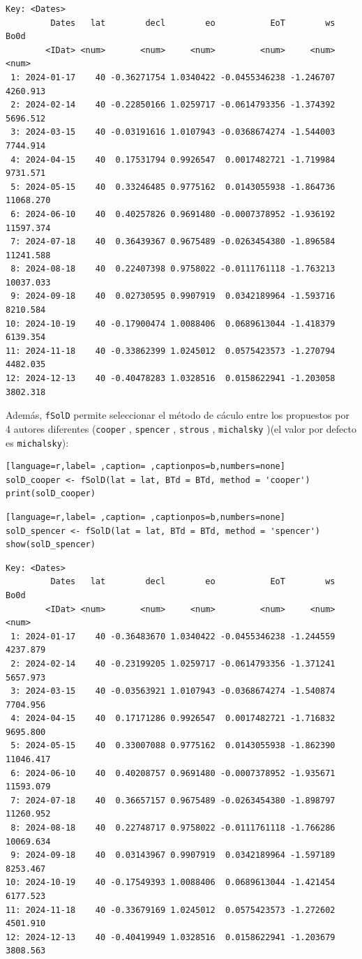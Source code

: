 \begin{verbatim}
Key: <Dates>
         Dates   lat        decl        eo           EoT        ws      Bo0d
        <IDat> <num>       <num>     <num>         <num>     <num>     <num>
 1: 2024-01-17    40 -0.36271754 1.0340422 -0.0455346238 -1.246707  4260.913
 2: 2024-02-14    40 -0.22850166 1.0259717 -0.0614793356 -1.374392  5696.512
 3: 2024-03-15    40 -0.03191616 1.0107943 -0.0368674274 -1.544003  7744.914
 4: 2024-04-15    40  0.17531794 0.9926547  0.0017482721 -1.719984  9731.571
 5: 2024-05-15    40  0.33246485 0.9775162  0.0143055938 -1.864736 11068.270
 6: 2024-06-10    40  0.40257826 0.9691480 -0.0007378952 -1.936192 11597.374
 7: 2024-07-18    40  0.36439367 0.9675489 -0.0263454380 -1.896584 11241.588
 8: 2024-08-18    40  0.22407398 0.9758022 -0.0111761118 -1.763213 10037.033
 9: 2024-09-18    40  0.02730595 0.9907919  0.0342189964 -1.593716  8210.584
10: 2024-10-19    40 -0.17900474 1.0088406  0.0689613044 -1.418379  6139.354
11: 2024-11-18    40 -0.33862399 1.0245012  0.0575423573 -1.270794  4482.035
12: 2024-12-13    40 -0.40478283 1.0328516  0.0158622941 -1.203058  3802.318
\end{verbatim}

Además, \texttt{fSolD} permite seleccionar el método de cáculo entre los propuestos por 4 autores diferentes (\texttt{cooper} \cite{Cooper1969}, \texttt{spencer} \cite{Spencer1971}, \texttt{strous} \cite{Strous2011}, \texttt{michalsky} \cite{Michalsky1988})(el valor por defecto es \texttt{michalsky}):
\begin{lstlisting}[language=r,label= ,caption= ,captionpos=b,numbers=none]
solD_cooper <- fSolD(lat = lat, BTd = BTd, method = 'cooper')
print(solD_cooper)
\end{lstlisting}

\begin{lstlisting}[language=r,label= ,caption= ,captionpos=b,numbers=none]
solD_spencer <- fSolD(lat = lat, BTd = BTd, method = 'spencer')
show(solD_spencer)
\end{lstlisting}

\begin{verbatim}
Key: <Dates>
         Dates   lat        decl        eo           EoT        ws      Bo0d
        <IDat> <num>       <num>     <num>         <num>     <num>     <num>
 1: 2024-01-17    40 -0.36483670 1.0340422 -0.0455346238 -1.244559  4237.879
 2: 2024-02-14    40 -0.23199205 1.0259717 -0.0614793356 -1.371241  5657.973
 3: 2024-03-15    40 -0.03563921 1.0107943 -0.0368674274 -1.540874  7704.956
 4: 2024-04-15    40  0.17171286 0.9926547  0.0017482721 -1.716832  9695.800
 5: 2024-05-15    40  0.33007088 0.9775162  0.0143055938 -1.862390 11046.417
 6: 2024-06-10    40  0.40208757 0.9691480 -0.0007378952 -1.935671 11593.079
 7: 2024-07-18    40  0.36657157 0.9675489 -0.0263454380 -1.898797 11260.952
 8: 2024-08-18    40  0.22748717 0.9758022 -0.0111761118 -1.766286 10069.634
 9: 2024-09-18    40  0.03143967 0.9907919  0.0342189964 -1.597189  8253.467
10: 2024-10-19    40 -0.17549393 1.0088406  0.0689613044 -1.421454  6177.523
11: 2024-11-18    40 -0.33679169 1.0245012  0.0575423573 -1.272602  4501.910
12: 2024-12-13    40 -0.40419949 1.0328516  0.0158622941 -1.203679  3808.563
\end{verbatim}


